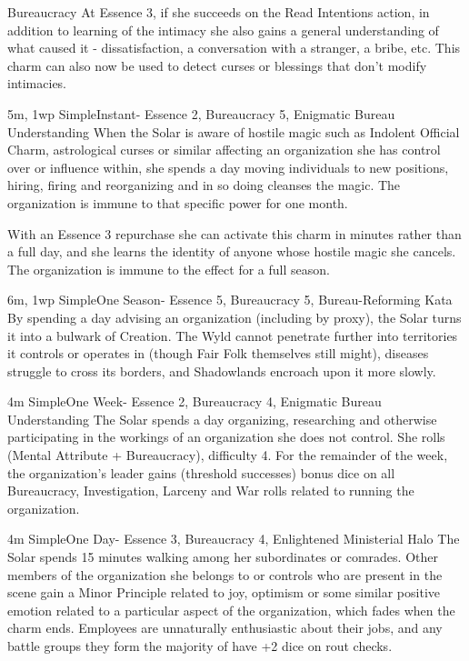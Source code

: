 \begin{Ability}{Bureaucracy}
  At Essence 3, if she succeeds on the Read Intentions action, in addition to learning of the intimacy she also gains a general understanding of what caused it - dissatisfaction, a conversation with a stranger, a bribe, etc. This charm can also now be used to detect curses or blessings that don't modify intimacies.

  {5m, 1wp}
  {Simple}{Instant}{-}
  {Essence 2, Bureaucracy 5, Enigmatic Bureau Understanding}
  When the Solar is aware of hostile magic such as Indolent Official Charm, astrological curses or similar affecting an organization she has control over or influence within, she spends a day moving individuals to new positions, hiring, firing and reorganizing and in so doing cleanses the magic. The organization is immune to that specific power for one month.

  With an Essence 3 repurchase she can activate this charm in minutes rather than a full day, and she learns the identity of anyone whose hostile magic she cancels. The organization is immune to the effect for a full season.

  {6m, 1wp}
  {Simple}{One Season}{-}
  {Essence 5, Bureaucracy 5, Bureau-Reforming Kata}
  By spending a day advising an organization (including by proxy), the Solar turns it into a bulwark of Creation. The Wyld cannot penetrate further into territories it controls or operates in (though Fair Folk themselves still might), diseases struggle to cross its borders, and Shadowlands encroach upon it more slowly.

  {4m}
  {Simple}{One Week}{-}
  {Essence 2, Bureaucracy 4, Enigmatic Bureau Understanding}
  The Solar spends a day organizing, researching and otherwise participating in the workings of an organization she does not control. She rolls (Mental Attribute + Bureaucracy), difficulty 4. For the remainder of the week, the organization's leader gains (threshold successes) bonus dice on all Bureaucracy, Investigation, Larceny and War rolls related to running the organization.

  {4m}
  {Simple}{One Day}{-}
  {Essence 3, Bureaucracy 4, Enlightened Ministerial Halo}
  The Solar spends 15 minutes walking among her subordinates or comrades. Other members of the organization she belongs to or controls who are present in the scene gain a Minor Principle related to joy, optimism or some similar positive emotion related to a particular aspect of the organization, which fades when the charm ends. Employees are unnaturally enthusiastic about their jobs, and any battle groups they form the majority of have +2 dice on rout checks.


\end{Ability}
